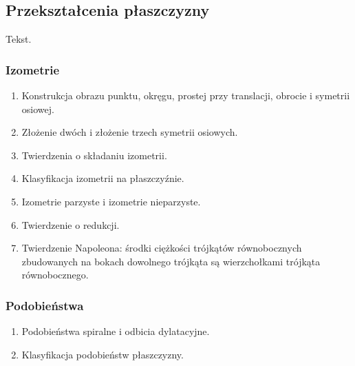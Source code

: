 %

\subsection{Przekształcenia płaszczyzny}
Tekst.

\subsubsection{Izometrie}
\begin{enumerate}
\item Konstrukcja obrazu punktu, okręgu, prostej przy translacji, obrocie i symetrii osiowej.
\item Złożenie dwóch i złożenie trzech symetrii osiowych.
\item Twierdzenia o składaniu izometrii.
\item Klasyfikacja izometrii na płaszczyźnie.
\item Izometrie parzyste i izometrie nieparzyste.
\item Twierdzenie o redukcji.
\item Twierdzenie Napoleona: środki ciężkości trójkątów równobocznych zbudowanych na bokach dowolnego trójkąta są wierzchołkami trójkąta równobocznego.
\end{enumerate}

\subsubsection{Podobieństwa}
\begin{enumerate}
\item Podobieństwa spiralne i odbicia dylatacyjne.
\item Klasyfikacja podobieństw płaszczyzny.
\end{enumerate}

%